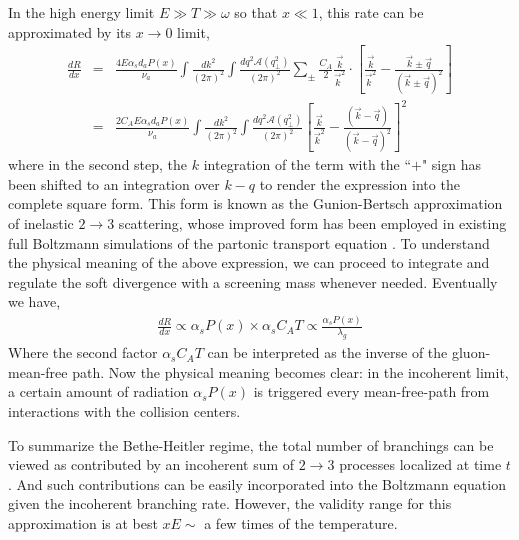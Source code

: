 In the high energy limit $E\gg T \gg \omega$ so that $x\ll 1$, this rate can be approximated by its $x\rightarrow 0$ limit, 
\begin{eqnarray}
\frac{dR}{dx} &=& \frac{4 E\alpha_s d_a P(x)}{\nu_a} \int \frac{dk^2}{(2\pi)^2} \int \frac{dq^2 \mathcal{A}(q_\perp^2)}{(2\pi)^2}  \sum_{\pm}
\frac{C_A}{2} \frac{\vec{k}}{\vec{k}^2}\cdot\left[\frac{\vec{k}}{\vec{k}^2}-\frac{\vec{k}\pm\vec{q}}{(\vec{k}\pm\vec{q})^2}\right] \\
&=& \frac{2 C_A E\alpha_s d_a P(x)}{\nu_a} \int \frac{dk^2}{(2\pi)^2} \int \frac{dq^2 \mathcal{A}(q_\perp^2)}{(2\pi)^2} 
\left[\frac{\vec{k}}{\vec{k}^2}-\frac{(\vec{k}-\vec{q})}{(\vec{k}-\vec{q})^2}\right]^2
\end{eqnarray}
where in the second step, the $k$ integration of the term with the ``$+$" sign has been shifted to an integration over $k-q$ to render the expression into the complete square form.
This form is known as the Gunion-Bertsch approximation \cite{PhysRevD.25.746} of inelastic $2\rightarrow 3$ scattering, whose improved form \cite{Fochler:2013epa,Uphoff:2014hza} has been employed in existing full Boltzmann simulations of the partonic transport equation \cite{Xu:2004mz,Uphoff:2010sh}.
To understand the physical meaning of the above expression, we can proceed to integrate and regulate the soft divergence with a screening mass whenever needed.
Eventually we have,
\begin{eqnarray}
\frac{dR}{dx} \propto \alpha_s P(x) \times \alpha_s C_A T \propto \frac{\alpha_s P(x)}{\lambda_g}
\label{eq:incoh-dR}
\end{eqnarray}
Where the second factor $\alpha_s C_A T$ can be interpreted as the inverse of the gluon-mean-free path. 
Now the physical meaning becomes clear: in the incoherent limit, a certain amount of radiation $\alpha_s P(x)$ is triggered every mean-free-path from interactions with the collision centers.

To summarize the Bethe-Heitler regime, the total number of branchings can be viewed as contributed by an incoherent sum of $2\rightarrow 3$ processes localized at time $t$.
And such contributions can be easily incorporated into the Boltzmann equation given the incoherent branching rate.
However, the validity range for this approximation is at best $x E \sim$ a few times of the temperature.

